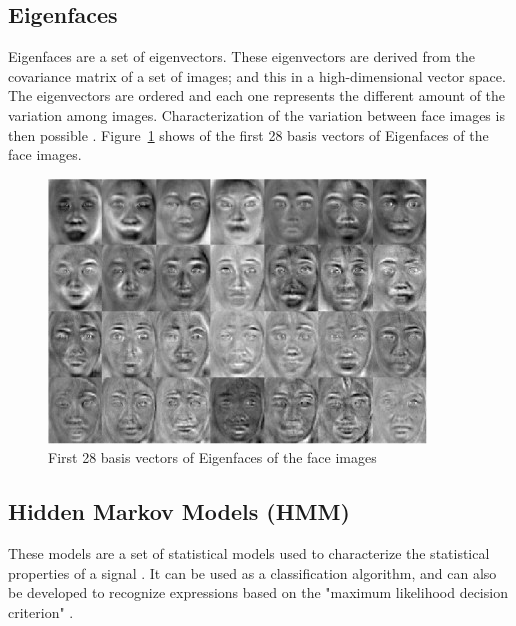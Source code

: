 \subsection{Eigenfaces}

\vspace{\baselineskip}
\noindent Eigenfaces are a set of eigenvectors. These eigenvectors are derived from the covariance matrix of a set of images; and this in a high-dimensional vector space. The eigenvectors are ordered and each one represents the different amount of the variation among images. Characterization of the variation between face images is then possible \cite{TUR91}. Figure~\ref{eigenface_example} shows of the first 28 basis vectors of Eigenfaces of the face images.
\newline

\begin{figure}[!h]
\begin{center}
\noindent \includegraphics[scale=1]{figures/eigenface_example} 
\newline
\caption{First 28 basis vectors of Eigenfaces of the face images}
\label{eigenface_example}
\end{center} 
\end{figure}

\subsection{Hidden Markov Models (HMM)}

\vspace{\baselineskip}
\noindent These models are a set of statistical models used to characterize the statistical properties of a signal \cite{RAB93}. It can be used as a classification algorithm, and can also be developed to recognize expressions based on the "maximum likelihood decision criterion" \cite{LIE98}.
\newline

